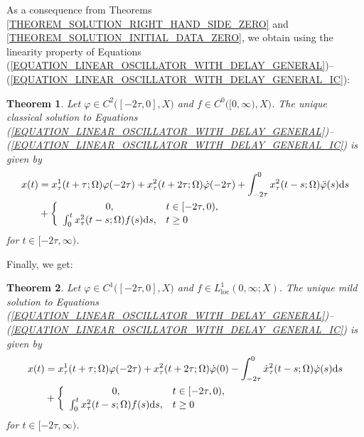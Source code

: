 \documentclass[12pt]{article}
\newtheorem{theorem}{Theorem}[section]
\numberwithin{equation}{section}
\numberwithin{equation}{section}
\begin{document}
	As a consequence from Theorems \ref{THEOREM_SOLUTION_RIGHT_HAND_SIDE_ZERO} and \ref{THEOREM_SOLUTION_INITIAL_DATA_ZERO}, we obtain
	using the linearity property of Equations (\ref{EQUATION_LINEAR_OSCILLATOR_WITH_DELAY_GENERAL})--(\ref{EQUATION_LINEAR_OSCILLATOR_WITH_DELAY_GENERAL_IC}):
	\begin{theorem}
		\label{THEOREM_REPRESENTATION_OF_CLASSICAL_SOLUTIONS}
		Let $\varphi \in C^{2}\big([-2\tau, 0], X\big)$ and $f \in C^{0}\big([0, \infty), X\big)$.
		The unique classical solution to Equations (\ref{EQUATION_LINEAR_OSCILLATOR_WITH_DELAY_GENERAL})--(\ref{EQUATION_LINEAR_OSCILLATOR_WITH_DELAY_GENERAL_IC}) is given by
		\begin{equation}
			\begin{split}
				x(t) &= x^{1}_{\tau}(t + \tau; \Omega) \varphi(-2\tau) + x^{2}_{\tau}(t + 2\tau; \Omega) \dot{\varphi}(-2\tau) + \int_{-2\tau}^{0} x^{2}_{\tau}(t - s; \Omega) \ddot{\varphi}(s) \mathrm{d}s \\
				&+ \left\{
				\begin{array}{cl}
					0, & t \in [-2\tau, 0), \\
					\int_{0}^{t} x^{2}_{\tau}(t - s; \Omega) f(s) \mathrm{d}s, & t \geq 0
				\end{array}\right.
			\end{split}
			\notag
		\end{equation}
		for $t \in [-2\tau, \infty)$.
	\end{theorem}

	Finally, we get:
	\begin{theorem}
		Let $\varphi \in C^{1}\big([-2\tau, 0], X\big)$ and $f \in L^{1}_{\mathrm{loc}}(0, \infty; X)$.
		The unique mild solution to Equations (\ref{EQUATION_LINEAR_OSCILLATOR_WITH_DELAY_GENERAL})--(\ref{EQUATION_LINEAR_OSCILLATOR_WITH_DELAY_GENERAL_IC}) is given by
		\begin{equation}
			\begin{split}
				x(t) &= x^{1}_{\tau}(t + \tau; \Omega) \varphi(-2\tau) + x^{2}_{\tau}(t + 2\tau; \Omega) \dot{\varphi}(0) - \int_{-2\tau}^{0} \dot{x}^{2}_{\tau}(t - s; \Omega) \dot{\varphi}(s) \mathrm{d}s \\
				&+ \left\{
				\begin{array}{cl}
					0, & t \in [-2\tau, 0), \\
					\int_{0}^{t} x^{2}_{\tau}(t - s; \Omega) f(s) \mathrm{d}s, & t \geq 0
				\end{array}\right.
			\end{split}
			\notag
		\end{equation}
		for $t \in [-2\tau, \infty)$.
	\end{theorem}
\end{document}
